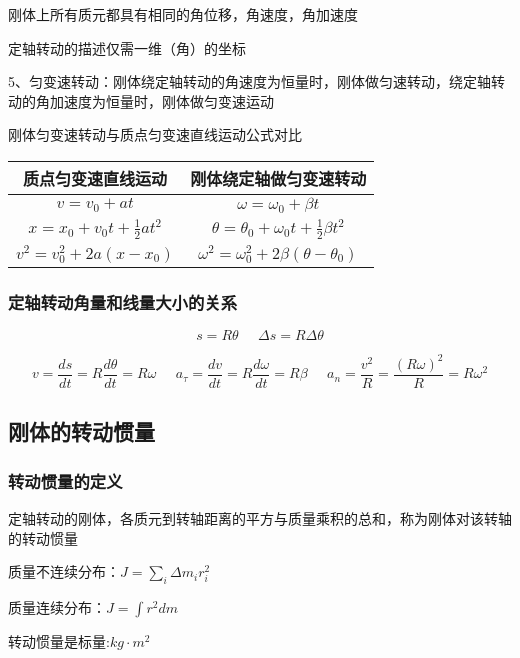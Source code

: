 \documentclass[UTF8]{article}
\begin{document}
    刚体上所有质元都具有相同的角位移，角速度，角加速度

    定轴转动的描述仅需一维（角）的坐标

    5、匀变速转动：刚体绕定轴转动的角速度为恒量时，刚体做匀速转动，绕定轴转动的角加速度为恒量时，刚体做匀变速运动

    刚体匀变速转动与质点匀变速直线运动公式对比

    \begin{tabular}{|c|c|}%
        \hline  %
        质点匀变速直线运动&刚体绕定轴做匀变速转动\\
        \hline  %
        $v = v_0 + at$&$\omega = \omega_0 + \beta t$\\
        \hline %
        $x = x_0 + v_0t + \frac{1}{2}at^2$&$\theta = \theta_0 + \omega_0t + \frac{1}{2}\beta t^2$\\
        \hline %
        $v^2 = v_0^2 + 2a(x - x_0)$&$\omega^2 = \omega_0^2 + 2\beta(\theta - \theta_0)$\\
        \hline %
    \end{tabular}

\subsubsection{定轴转动角量和线量大小的关系}

    \[s = R\theta\;\;\;\;\;\Delta s = R\Delta\theta\]

    \[v = \frac{ds}{dt} = R\frac{d\theta}{dt} = R\omega\;\;\;\;\;a_\tau = \frac{dv}{dt} = R\frac{d\omega}{dt} = R\beta\;\;\;\;\;a_n = \frac{v^2}{R} = \frac{(R\omega)^2}{R} = R\omega^2\]
\subsection{刚体的转动惯量}
\subsubsection{转动惯量的定义}

    定轴转动的刚体，各质元到转轴距离的平方与质量乘积的总和，称为刚体对该转轴的转动惯量

    质量不连续分布：$J = \sum_i \Delta m_ir_i^2$

    质量连续分布：$J = \int r^2dm$

    转动惯量是标量\;\;\;\;\;[SI]:$kg\cdot m^2$
\end{document}
